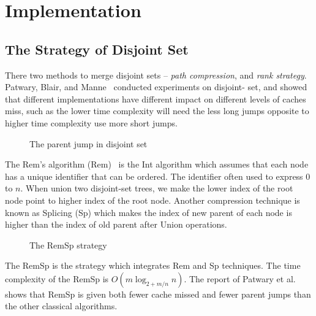\section{Implementation}
\label{sec:Implementation}

\subsection{The Strategy of Disjoint Set}

There two methods to merge disjoint sets -- {\em path compression}, and
{\em rank strategy}.  Patwary, Blair, and
Manne~\cite{Patwary2010ExperimentsOU} conducted experiments on disjoint-
set, and showed that different implementations have different impact on
different levels of caches miss, such as the lower time complexity will
need the less long jumps opposite to higher time complexity use more
short jumps. %

\begin{figure}[!thb]
  \centering {} 
  \caption{The parent jump in disjoint set}
  \label{fig:long-short-jump-disjoint}
\end{figure}


The Rem's algorithm ({\sc Rem})~\cite{dijkstra1976a} is the {\sc Int}
algorithm which assumes that each node has a unique identifier that can
be ordered.  The identifier often used to express $0$ to $n$.  When
union two disjoint-set trees, we make the lower index of the root node
point to higher index of the root node. Another compression technique is
known as {\sc Splicing} ({\sc Sp}) which makes the index of new parent
of each node is higher than the index of old parent after {\sc Union}
operations.

\begin{figure}[!thb]
  \centering {} 
  \caption{The {\sc RemSp} strategy}
  \label{fig:RemSp-strategy}
\end{figure}


The {\sc RemSp} is the strategy which integrates {\sc Rem} and {\sc Sp}
techniques.  The time complexity of the {\sc RemSp} is $O(m \log_{2+m/n}
n)$.  The report of Patwary et al.~\cite{Patwary2010ExperimentsOU} shows
that {\sc RemSp} is given both fewer cache missed and fewer parent jumps
than the other classical algorithms.

